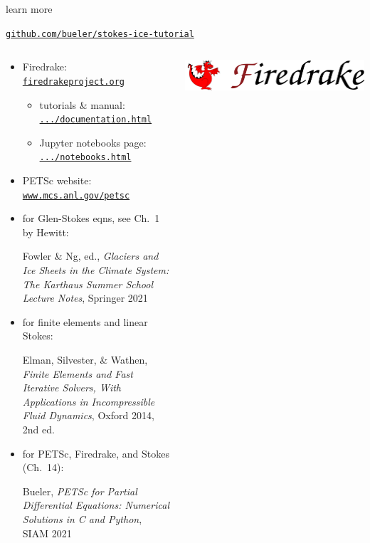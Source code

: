 \documentclass[10pt,
               hyperref={colorlinks,citecolor=DeepPink4,linkcolor=black,urlcolor=blue},
               svgnames]{beamer}
\begin{document}
\begin{frame}{learn more}

\centerline{\large \href{https://github.com/bueler/stokes-ice-tutorial}{\texttt{github.com/bueler/stokes-ice-tutorial}}}

\medskip
\hrulefill


\begin{columns}
\begin{column}{0.6\textwidth}
\small

\begin{itemize}
\item Firedrake: \href{https://www.firedrakeproject.org/}{\texttt{firedrakeproject.org}}

    \begin{itemize}
    \scriptsize
    \item tutorials \& manual: \href{https://www.firedrakeproject.org/documentation.html}{\texttt{.../documentation.html}}
    \item Jupyter notebooks page: \href{https://www.firedrakeproject.org/notebooks.html}{\texttt{.../notebooks.html}}
    \end{itemize}
\item PETSc website: \href{https://www.mcs.anl.gov/petsc/}{\texttt{www.mcs.anl.gov/petsc}}
\item for Glen-Stokes eqns, see Ch.~1 by Hewitt:


{\scriptsize Fowler \& Ng, ed., \emph{Glaciers and Ice Sheets in the Climate System: The Karthaus Summer School Lecture Notes}, Springer 2021}

\item for finite elements and linear Stokes:

{\scriptsize Elman, Silvester, \& Wathen, \emph{Finite Elements and Fast Iterative Solvers, With Applications in Incompressible Fluid Dynamics}, Oxford 2014, 2nd ed.}

\item for PETSc, Firedrake, and Stokes (Ch.~14):

{\scriptsize Bueler, \emph{PETSc for Partial Differential Equations: Numerical Solutions in C and Python}, SIAM 2021}
\end{itemize}
\end{column}

\begin{column}{0.4\textwidth}

\bigskip
\href{https://www.firedrakeproject.org/}{\includegraphics[width=\textwidth]{figs/firedrakebanner.png}}


\end{column}
\end{columns}
\end{frame}
\end{document}
